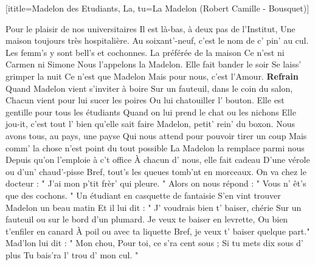  [ititle={Madelon des Etudiants, La}, tu={La Madelon (Robert Camille - Bousquet)}]

\beginverse 
Pour le plaisir de nos universitaires
Il est là-bas, à deux pas de l'Institut,
Une maison toujours très hospitalière.
Au soixant'-neuf, c'est le nom de c' pin' au cul.
Les femm's y sont bell's et cochonnes.
La préférée de la maison
Ce n'est ni Carmen ni Simone
Nous l'appelons la Madelon.
Elle fait bander le soir
Se laiss' grimper la nuit
Ce n'est que Madelon
Mais pour nous, c'est l'Amour.
\endverse
\beginchorus
\textbf{Refrain}
Quand Madelon vient s'inviter à boire
Sur un fauteuil, dans le coin du salon,
Chacun vient pour lui sucer les poires
Ou lui chatouiller l' bouton.
Elle est gentille pour tous les étudiants
Quand on lui prend le chat ou les nichons
Elle jou-it, c'est tout l' bien qu'elle sait faire
Madelon, petit' rein' du boxon.
\endchorus
\beginverse
Nous avons tous, au pays, une payse
Qui nous attend pour pouvoir tirer un coup
Mais comm' la chose n'est point du tout possible
La Madelon la remplace parmi nous
Depuis qu'on l'emploie à c't office
À chacun d' nous, elle fait cadeau
D'une vérole ou d'un' chaud'-pisse
Bref, tout's les queues tomb'nt en morceaux.
On va chez le docteur :
" J'ai mon p'tit frèr' qui pleure. "
Alors on nous répond :
" Vous n' êt's que des cochons. "
\endverse
\beginverse
Un étudiant en casquette de fantaisie
S'en vint trouver Madelon un beau matin
Et il lui dit : " J' voudrais bien t' baiser, chérie
Sur un fauteuil ou sur le bord d'un plumard.
Je veux te baiser en levrette,
Ou bien t'enfiler en canard
À poil ou avec ta liquette
Bref, je veux t' baiser quelque part."
Mad'lon lui dit : " Mon chou,
Pour toi, ce s'ra cent sous ;
Si tu mets dix sous d' plus
Tu bais'ra l' trou d' mon cul. "
\endverse
\endchorus
